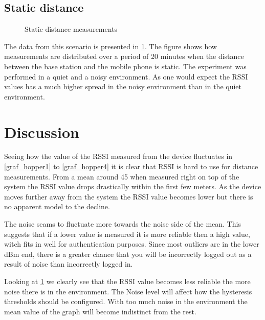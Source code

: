 \subsection{Static distance}
\begin{figure}
	
	
	\caption{Static distance measurements}
	\label{graf_StaticMesurements}
\end{figure}

The data from this scenario is presented in \cref{graf_StaticMesurements}.
The figure shows how measurements are distributed over a period of 20 minutes when the distance between the base station and the mobile phone is static.
The experiment was performed in a quiet and a noisy environment.
As one would expect the RSSI values has a much higher spread in the noisy environment than in the quiet environment. 
 

\section{Discussion}
Seeing how the value of the RSSI measured from the device fluctuates in \cref{graf_hopper1} to \cref{graf_hopper4} it is clear that RSSI is hard to use for distance measurements.
From a mean around 45 when measured right on top of the system the RSSI value drops drastically within the first few meters.
As the device moves further away from the system the RSSI value becomes lower but there is no apparent model to the decline.

The noise seams to fluctuate more towards the noise side of the mean. This suggests that if a lower value is measured it is more reliable then a high value, witch fits in well for authentication purposes.
Since most outliers are in the lower dBm end, there is a greater chance that you will be incorrectly logged out as a result of noise than incorrectly logged in.

Looking at \cref{graf_StaticMesurements} we clearly see that the RSSI value becomes less reliable the more noise there is in the environment.
The Noise level will affect how the hysteresis thresholds should be configured.
With too much noise in the environment the mean value of the graph will become indistinct from the rest.


